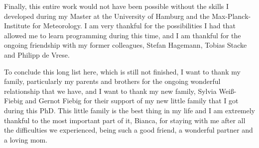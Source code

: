 \begin{acknowledgements}
 Finally, this entire work would not have been possible without the skills I developed during my Master at the University of Hamburg and the Max-Planck-Institute for Meteorology. I am very thankful for the possibilities I had that allowed me to learn programming during this time, and I am thankful for the ongoing friendship with my former colleagues, Stefan Hagemann, Tobias Stacke and Philipp de Vrese. 
 
 To conclude this long list here, which is still not finished, I want to thank my family, particularly my parents and brothers for the ongoing wonderful relationship that we have, and I want to thank my new family, Sylvia Weiß-Fiebig and Gernot Fiebig for their support of my new little family that I got during this PhD. This little family is the best thing in my life and I am extremely thankful to the most important part of it, Bianca, for staying with me after all the difficulties we experienced, being such a good friend, a wonderful partner and a loving mom.
\end{acknowledgements}


